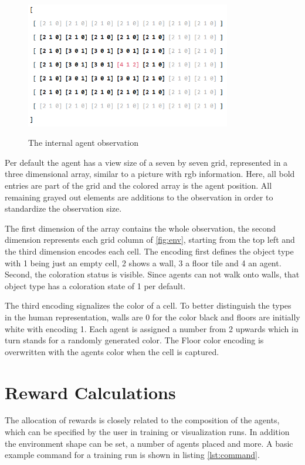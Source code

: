\begin{figure}[hpbt]
    \centering
    \includegraphics[width=0.8\textwidth]{pictures/agent_observation}\\
    \caption[agent observation]{The internal agent observation}\label{fig:agent_obs}
\end{figure}

Per default the agent has a view size of a seven by seven grid, represented in a three dimensional array, similar to a picture with rgb information. Here, all bold entries are part of the grid and the colored array is the agent position. All remaining grayed out elements are additions to the observation in order to standardize the observation size.

The first dimension of the array contains the whole observation, the second dimension represents each grid column of \ref{fig:env}, starting from the top left and the third dimension encodes each cell. The encoding first defines the object type with 1 being just an empty cell, 2 shows a wall, 3 a floor tile and 4 an agent. Second, the coloration status is visible. Since agents can not walk onto walls, that object type has a coloration state of 1 per default.

The third encoding signalizes the color of a cell. To better distinguish the types in the human representation, walls are 0 for the color black and floors are initially white with encoding 1. Each agent is assigned a number from 2 upwards which in turn stands for a randomly generated color. The Floor color encoding is overwritten with the agents color when the cell is captured.

\section{Reward Calculations}
The allocation of rewards is closely related to the composition of the agents, which can be specified by the user in training or visualization runs. In addition the environment shape can be set, a number of agents placed and more. A basic example command for a training run is shown in listing \ref{lst:command}.

